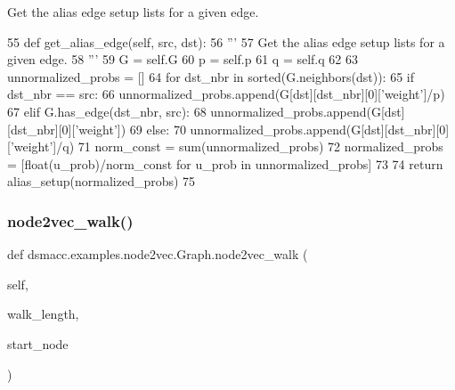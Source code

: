 \begin{DoxyVerb}Get the alias edge setup lists for a given edge.
\end{DoxyVerb}
 
\begin{DoxyCode}
55     \textcolor{keyword}{def }get\_alias\_edge(self, src, dst):
56         \textcolor{stringliteral}{'''}
57 \textcolor{stringliteral}{        Get the alias edge setup lists for a given edge.}
58 \textcolor{stringliteral}{        '''}
59         G = self.G
60         p = self.p
61         q = self.q
62 
63         unnormalized\_probs = []
64         \textcolor{keywordflow}{for} dst\_nbr \textcolor{keywordflow}{in} sorted(G.neighbors(dst)):
65             \textcolor{keywordflow}{if} dst\_nbr == src:
66                 unnormalized\_probs.append(G[dst][dst\_nbr][0][\textcolor{stringliteral}{'weight'}]/p)
67             \textcolor{keywordflow}{elif} G.has\_edge(dst\_nbr, src):
68                 unnormalized\_probs.append(G[dst][dst\_nbr][0][\textcolor{stringliteral}{'weight'}])
69             \textcolor{keywordflow}{else}:
70                 unnormalized\_probs.append(G[dst][dst\_nbr][0][\textcolor{stringliteral}{'weight'}]/q)
71         norm\_const = sum(unnormalized\_probs)
72         normalized\_probs =  [float(u\_prob)/norm\_const \textcolor{keywordflow}{for} u\_prob \textcolor{keywordflow}{in} unnormalized\_probs]
73 
74         \textcolor{keywordflow}{return} alias\_setup(normalized\_probs)
75 
\end{DoxyCode}
\mbox{\label{classdsmacc_1_1examples_1_1node2vec_1_1Graph_ae81b905fa75b4ced46d0722cf85d90dd}} 
\subsubsection{\texorpdfstring{node2vec\+\_\+walk()}{node2vec\_walk()}}
{\footnotesize\ttfamily def dsmacc.\+examples.\+node2vec.\+Graph.\+node2vec\+\_\+walk (\begin{DoxyParamCaption}\item[{}]{self,  }\item[{}]{walk\+\_\+length,  }\item[{}]{start\+\_\+node }\end{DoxyParamCaption})}

